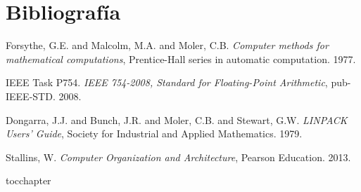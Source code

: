 \documentclass[11pt, spanish]{article}
\begin{document}
\newpage
\section{Bibliografía}

\begingroup
\renewcommand{\section}[2]{}%
\begin{thebibliography}{}

   Forsythe, G.E. and Malcolm, M.A. and Moler, C.B. {\em Computer methods for mathematical computations}, Prentice-Hall series in automatic computation. 1977.
  
   IEEE Task P754. {\em IEEE 754-2008, Standard for Floating-Point Arithmetic}, pub-IEEE-STD. 2008.
  
   Dongarra, J.J. and Bunch, J.R. and Moler, C.B. and Stewart, G.W. {\em LINPACK Users' Guide}, Society for Industrial and Applied Mathematics. 1979.
  
   Stallins, W. {\em Computer Organization and Architecture}, Pearson Education. 2013.
  
\end{thebibliography}
\endgroup

\newpage
\section{Scripts}













\addcontentsline{toc}{chapter}{\lstlistlistingname}
\lstlistoflistings


\end{document}
